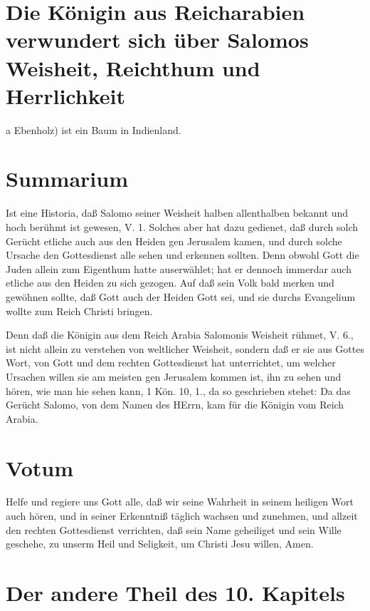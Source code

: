 \section[Die Königin aus Reicharabien verwundert sich über Salomos]{Die Königin aus Reicharabien verwundert sich über Salomos Weisheit, Reichthum und Herrlichkeit}

a Ebenholz) ist ein Baum in Indienland.

\section{Summarium}

Ist eine Historia, daß Salomo seiner Weisheit halben allenthalben bekannt und hoch berühmt ist gewesen, V. 1. Solches aber hat dazu gedienet, daß durch solch Gerücht etliche auch aus den Heiden gen Jerusalem kamen, und durch solche Ursache den Gottesdienst alle sehen und erkennen sollten. Denn obwohl Gott die Juden allein zum Eigenthum hatte auserwählet; hat er dennoch immerdar auch etliche aus den Heiden zu sich gezogen. Auf daß sein Volk bald merken und gewöhnen sollte, daß Gott auch der Heiden Gott sei, und sie durchs Evangelium wollte zum Reich Christi bringen.

Denn daß die Königin aus dem Reich Arabia Salomonis Weisheit rühmet, V. 6., ist nicht allein zu verstehen von weltlicher Weisheit, sondern daß er sie aus Gottes Wort, von Gott und dem rechten Gottesdienst hat unterrichtet, um welcher Ursachen willen sie am meisten gen Jerusalem kommen ist, ihn zu sehen und hören, wie man hie sehen kann, 1 Kön. 10, 1., da so geschrieben stehet: Da das Gerücht Salomo, von dem Namen des HErrn, kam für die Königin vom Reich Arabia.

\section{Votum}

Helfe und regiere uns Gott alle, daß wir seine Wahrheit in seinem heiligen Wort auch hören, und in seiner Erkenntniß täglich wachsen und zunehmen, und allzeit den rechten Gottesdienst verrichten, daß sein Name geheiliget und sein Wille geschehe, zu unserm Heil und Seligkeit, um Christi Jesu willen, Amen.

\section{Der andere Theil des 10. Kapitels}

